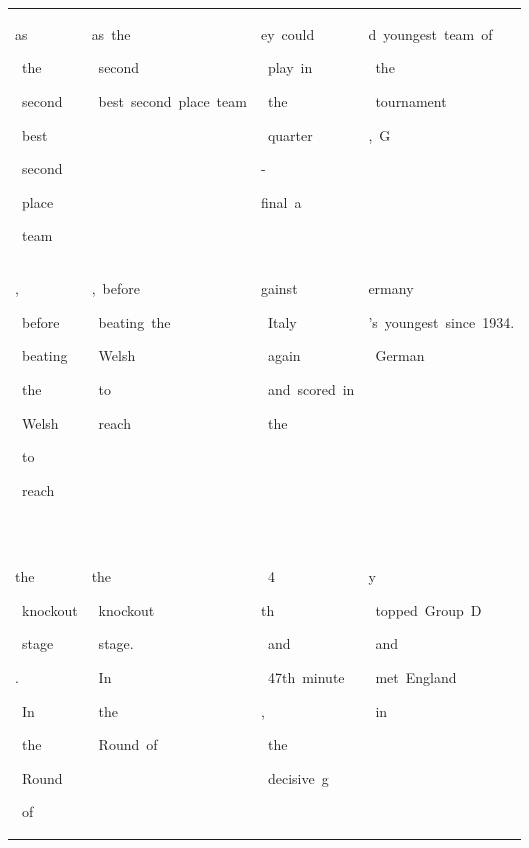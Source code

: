 \begin{table}[h]
\begin{tabular}{ l | l | l | l }
 \colorbox{cm_32!40}{\strut as}\colorbox{cm_36!40}{\strut \ the}\colorbox{cm_32!40}{\strut \ second}\colorbox{cm_22!40}{\strut \ best}\colorbox{cm_17!40}{\strut \ second}\colorbox{cm_35!40}{\strut \ place}\colorbox{cm_31!40}{\strut \ team} & \colorbox{cm_12!40}{\strut as\ the}\colorbox{cm_25!40}{\strut \ second}\colorbox{cm_12!40}{\strut \ best\ second\ place\ team} & \colorbox{cm_0!40}{\strut ey\ could}\colorbox{cm_12!40}{\strut \ play\ in}\colorbox{cm_25!40}{\strut \ the}\colorbox{cm_0!40}{\strut \ quarter}\colorbox{cm_12!40}{\strut -}\colorbox{cm_0!40}{\strut final\ a} & \colorbox{cm_0!40}{\strut d\ youngest\ team\ of}\colorbox{cm_12!40}{\strut \ the}\colorbox{cm_0!40}{\strut \ tournament}\colorbox{cm_12!40}{\strut ,\ G} \\ 
 \colorbox{cm_36!40}{\strut ,}\colorbox{cm_26!40}{\strut \ before}\colorbox{cm_13!40}{\strut \ beating}\colorbox{cm_10!40}{\strut \ the}\colorbox{cm_36!40}{\strut \ Welsh}\colorbox{cm_29!40}{\strut \ to}\colorbox{cm_15!40}{\strut \ reach}\colorbox{cm_32!40}{\strut \ } & \colorbox{cm_25!40}{\strut ,\ before}\colorbox{cm_12!40}{\strut \ beating\ the}\colorbox{cm_0!40}{\strut \ Welsh}\colorbox{cm_12!40}{\strut \ to}\colorbox{cm_0!40}{\strut \ reach}\colorbox{cm_12!40}{\strut \ } & \colorbox{cm_0!40}{\strut gainst}\colorbox{cm_12!40}{\strut \ Italy}\colorbox{cm_0!40}{\strut \ again}\colorbox{cm_12!40}{\strut \ and\ scored\ in}\colorbox{cm_25!40}{\strut \ the} & \colorbox{cm_12!40}{\strut ermany}\colorbox{cm_0!40}{\strut 's\ youngest\ since\ 1934.}\colorbox{cm_12!40}{\strut \ German} \\ 
 \colorbox{cm_32!40}{\strut the}\colorbox{cm_33!40}{\strut \ knockout}\colorbox{cm_31!40}{\strut \ stage}\colorbox{cm_30!40}{\strut .}\colorbox{cm_26!40}{\strut \ In}\colorbox{cm_32!40}{\strut \ the}\colorbox{cm_44!40}{\strut \ Round}\colorbox{cm_32!40}{\strut \ of\ } & \colorbox{cm_12!40}{\strut the}\colorbox{cm_0!40}{\strut \ knockout}\colorbox{cm_12!40}{\strut \ stage.}\colorbox{cm_25!40}{\strut \ In}\colorbox{cm_38!40}{\strut \ the}\colorbox{cm_12!40}{\strut \ Round\ of\ } & \colorbox{cm_12!40}{\strut \ 4}\colorbox{cm_0!40}{\strut th}\colorbox{cm_12!40}{\strut \ and}\colorbox{cm_0!40}{\strut \ 47th\ minute}\colorbox{cm_12!40}{\strut ,}\colorbox{cm_25!40}{\strut \ the}\colorbox{cm_0!40}{\strut \ decisive\ g} & \colorbox{cm_12!40}{\strut y}\colorbox{cm_0!40}{\strut \ topped\ Group\ D}\colorbox{cm_12!40}{\strut \ and}\colorbox{cm_0!40}{\strut \ met\ England}\colorbox{cm_12!40}{\strut \ in}\colorbox{cm_25!40}{\strut \ } \\ 

\end{tabular}
\end{table}
